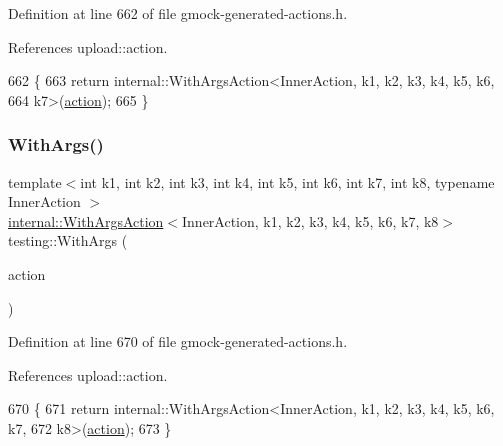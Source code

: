 Definition at line 662 of file gmock-\/generated-\/actions.\+h.



References upload\+::action.


\begin{DoxyCode}
662                                     \{
663   \textcolor{keywordflow}{return} internal::WithArgsAction<InnerAction, k1, k2, k3, k4, k5, k6,
664       k7>(\hyperlink{namespaceupload_a675d13c979f1c720866d22ed1736f580}{action});
665 \}
\end{DoxyCode}
\mbox{\label{namespacetesting_a16c131c0d58ae07d2e1ee6c7a44aaad1}} 
\subsubsection{\texorpdfstring{With\+Args()}{WithArgs()}\hspace{0.1cm}{\footnotesize\ttfamily [8/10]}}
{\footnotesize\ttfamily template$<$int k1, int k2, int k3, int k4, int k5, int k6, int k7, int k8, typename Inner\+Action $>$ \\
\hyperlink{classtesting_1_1internal_1_1WithArgsAction}{internal\+::\+With\+Args\+Action}$<$Inner\+Action, k1, k2, k3, k4, k5, k6, k7, k8$>$ testing\+::\+With\+Args (\begin{DoxyParamCaption}\item[{const Inner\+Action \&}]{action }\end{DoxyParamCaption})\hspace{0.3cm}{\ttfamily [inline]}}



Definition at line 670 of file gmock-\/generated-\/actions.\+h.



References upload\+::action.


\begin{DoxyCode}
670                                     \{
671   \textcolor{keywordflow}{return} internal::WithArgsAction<InnerAction, k1, k2, k3, k4, k5, k6, k7,
672       k8>(\hyperlink{namespaceupload_a675d13c979f1c720866d22ed1736f580}{action});
673 \}
\end{DoxyCode}
\mbox{\label{namespacetesting_a6aec78e6c201b150c78271e3f851414e}} 
